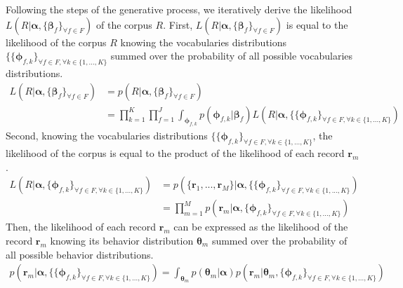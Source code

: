 Following the steps of the generative process, we iteratively derive the likelihood $L(R|\boldsymbol{\alpha}, \{\boldsymbol{\beta }_{f}\}_{\forall f\in F})$ of the corpus $R$. First, $L(R|\boldsymbol{\alpha},\{\boldsymbol{\beta }_{f}\}_{\forall f\in F})$ is equal to the likelihood of the corpus $R$ knowing the vocabularies distributions $\{\{\boldsymbol{\phi }_{f,k}\}_{\forall f \in F, \forall k\in\{1,...,K\}}$ summed over the probability of all possible vocabularies distributions.
\begin{equation} \label{eqghcmmdtlik}
\begin{aligned} 
L(R|\boldsymbol{\alpha}, \{\boldsymbol{\beta }_{f}\}_{\forall f\in F})&=p(R|\boldsymbol{\alpha},\{\boldsymbol{\beta }_{f}\}_{\forall f\in F})\\
&=\prod_{k=1}^{K}\prod_{f=1}^{J}\int_{\boldsymbol{\phi}_{f,k}}p(\boldsymbol{\phi }_{f,k}|\boldsymbol{\beta }_{f})L(R|\boldsymbol{\alpha}, \{\{\boldsymbol{\phi }_{f,k}\}_{\forall f \in F, \forall k\in\{1,...,K\}})
\end{aligned} 
\end{equation}
Second, knowing the vocabularies distributions $\{\{\boldsymbol{\phi }_{f,k}\}_{\forall f \in F, \forall k\in\{1,...,K\}}$, the likelihood of the corpus is equal to the product of the likelihood of each record $\mathbf{r}_{m}$.
\begin{equation}
\begin{aligned} 
L(R|\boldsymbol{\alpha}, \{\boldsymbol{\phi }_{f,k}\}_{\forall f \in F, \forall k\in\{1,...,K\}})&=p(\{\mathbf{r}_{1},...,\mathbf{r}_{M}\}|\boldsymbol{\alpha}, \{\{\boldsymbol{\phi }_{f,k}\}_{\forall f \in F, \forall k\in\{1,...,K\}})\\
&=\prod_{m=1}^{M}p(\mathbf{r}_{m}|\boldsymbol{\alpha}, \{\boldsymbol{\phi}_{f,k}\}_{\forall f \in F, \forall k\in\{1,...,K\}})
\end{aligned} 
\end{equation}
Then, the likelihood of each record $\mathbf{r}_{m}$ can be expressed as the likelihood of the record $\mathbf{r}_{m}$ knowing its behavior distribution $\boldsymbol{\theta}_{m}$ summed over the probability of all possible behavior distributions.
\begin{equation}
\begin{split} 
p(\mathbf{r}_{m}|\boldsymbol{\alpha}, \{\{\boldsymbol{\phi }_{f,k}\}_{\forall f \in F, \forall k\in\{1,...,K\}})=\int_{\boldsymbol{\theta}_{m} }p(\boldsymbol{\theta}_{m}|\boldsymbol{\alpha })p(\mathbf{r}_{m}|\boldsymbol{\theta }_{m}, \{\boldsymbol{\phi}_{f,k}\}_{\forall f \in F, \forall k\in\{1,...,K\}})
\end{split} 
\end{equation}
